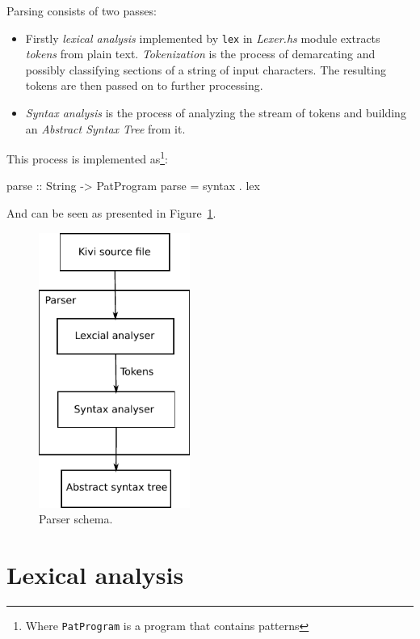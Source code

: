 \documentclass[12pt,a4paper]{report}
\begin{document}
Parsing consists of two passes:

\begin{itemize}
  \item Firstly \textit{lexical analysis} implemented by \texttt{lex} in
    \textit{Lexer.hs} module extracts \textit{tokens} from plain text.
    \textit{Tokenization} is the process of demarcating and possibly
    classifying sections of a string of input characters. The resulting tokens
    are then passed on to further processing.
  \item \textit{Syntax analysis} is the process of analyzing the stream of
    tokens and building an \textit{Abstract Syntax Tree} from it.
\end{itemize}

This process is implemented as\footnote{Where \texttt{PatProgram} is a program
that contains patterns}:

\vspace*{0.2in}
  \begin{code}
  parse :: String -> PatProgram
  parse = syntax . lex
  \end{code}

And can be seen as presented in Figure~\ref{fig:parser}.

\vspace*{0.2in}
\begin{figure}[h!]
  \centering
  \includegraphics[height=9cm]{parser}
  \caption{Parser schema.}
  \label{fig:parser}
\end{figure}

\section{Lexical analysis}
\end{document}
